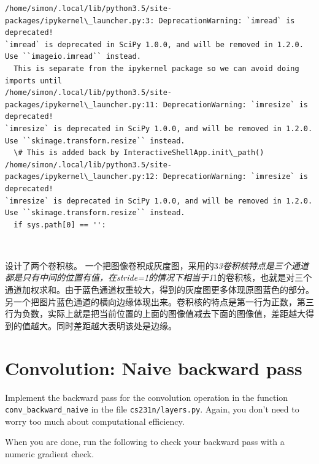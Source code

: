 \documentclass[11pt]{article}
\begin{document}
    \begin{Verbatim}[commandchars=\\\{\}]
/home/simon/.local/lib/python3.5/site-packages/ipykernel\_launcher.py:3: DeprecationWarning: `imread` is deprecated!
`imread` is deprecated in SciPy 1.0.0, and will be removed in 1.2.0.
Use ``imageio.imread`` instead.
  This is separate from the ipykernel package so we can avoid doing imports until
/home/simon/.local/lib/python3.5/site-packages/ipykernel\_launcher.py:11: DeprecationWarning: `imresize` is deprecated!
`imresize` is deprecated in SciPy 1.0.0, and will be removed in 1.2.0.
Use ``skimage.transform.resize`` instead.
  \# This is added back by InteractiveShellApp.init\_path()
/home/simon/.local/lib/python3.5/site-packages/ipykernel\_launcher.py:12: DeprecationWarning: `imresize` is deprecated!
`imresize` is deprecated in SciPy 1.0.0, and will be removed in 1.2.0.
Use ``skimage.transform.resize`` instead.
  if sys.path[0] == '':

    \end{Verbatim}

    \begin{center}
    \end{center}
    { \hspace*{\fill} \\}
    
     设计了两个卷积核。
一个把图像卷积成灰度图，采用的3\emph{3卷积核特点是三个通道都是只有中间的位置有值，在stride=1的情况下相当于1}1的卷积核，也就是对三个通道加权求和。由于蓝色通道权重较大，得到的灰度图更多体现原图蓝色的部分。
另一个把图片蓝色通道的横向边缘体现出来。卷积核的特点是第一行为正数，第三行为负数，实际上就是把当前位置的上面的图像值减去下面的图像值，差距越大得到的值越大。同时差距越大表明该处是边缘。

    \hypertarget{convolution-naive-backward-pass}{%
\section{Convolution: Naive backward
pass}\label{convolution-naive-backward-pass}}

Implement the backward pass for the convolution operation in the
function \texttt{conv\_backward\_naive} in the file
\texttt{cs231n/layers.py}. Again, you don't need to worry too much about
computational efficiency.

When you are done, run the following to check your backward pass with a
numeric gradient check.
\end{document}
